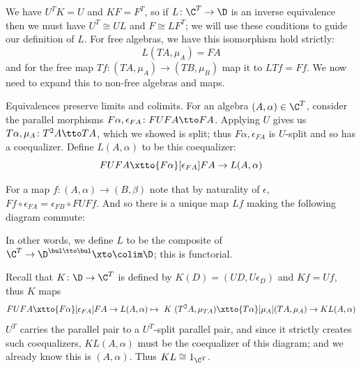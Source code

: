     We have $U^TK=U$ and $KF=F^T$, so if $L\colon\C^T\to\D$ is an inverse equivalence then we must have $U^T\cong UL$ and $F\cong LF^T$; we will use these conditions to
    guide our definition of $L$.
    For free algebras, we have this isomorphism hold strictly:
    $$ L(TA,\mu_A) = FA $$
    and for the free map $Tf\colon(TA,\mu_A)\to(TB,\mu_B)$ map it to $LTf=Ff$.
    We now need to expand this to non-free algebras and maps.

    Equivalences preserve limits and colimits.
    For an algebra $(A,\alpha)\in\C^T$, consider the parallel morphisms $F\alpha,\epsilon_{FA}\colon FUFA\tto FA$.
    Applying $U$ gives us $T\alpha,\mu_A\colon T^2A\tto TA$, which we showed is split; thus $F\alpha,\epsilon_{FA}$ is $U$-split and so has a coequalizer.
    Define $L(A,\alpha)$ to be this coequalizer:
    $$ FUFA\xtto{F\alpha}[\epsilon_{FA}]FA\to L(A,\alpha) $$

    For a map $f\colon(A,\alpha)\to(B,\beta)$ note that by naturality of $\epsilon$, $Ff\circ\epsilon_{FA}=\epsilon_{FB}\circ FUFf$.
    And so there is a unique map $Lf$ making the following diagram commute:

    \medskip
    \centerline{}
    \medskip

    In other words, we define $L$ to be the composite of $\C^T\to\D^{\bul\tto\bul}\xto\colim\D$; this is functorial.

    Recall that $K\colon\D\to\C^T$ is defined by $K(D)=(UD,U\epsilon_D)$ and $Kf=Uf$, thus $K$ maps
    $$ FUFA\xtto{F\alpha}[\epsilon_{FA}]FA\to L(A,\alpha) \mapsto{\ K\ } (T^2A,\mu_{TA})\xtto{T\alpha}[\mu_A](TA,\mu_A)\to KL(A,\alpha) $$
    $U^T$ carries the parallel pair to a $U^T$-split parallel pair, and since it strictly creates such coequalizers, $KL(A,\alpha)$ must be the coequalizer
    of this diagram; and we already know this is $(A,\alpha)$.
    Thus $KL\cong1_{\C^T}$.

